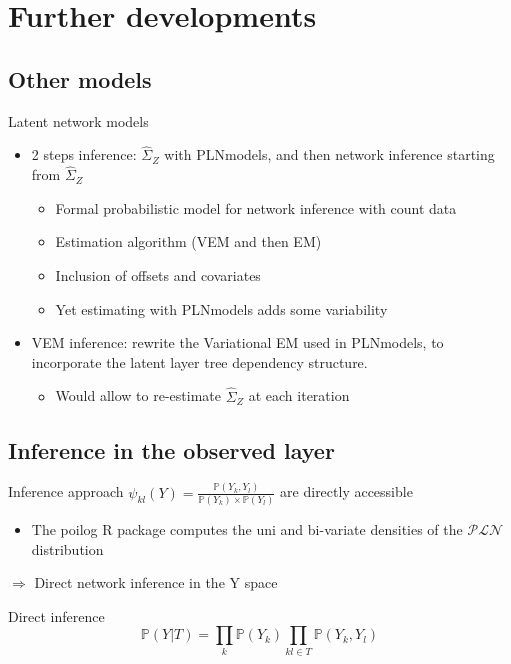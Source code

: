 \documentclass[9pt]{beamer}
\newcommand{\emphase}[1]{\textcolor{Complement}{#1}}
\begin{document}
\section{Further developments}
\subsection{Other models}
\begin{frame}{Latent network models}
\large{
    \begin{itemize}
        \item 2 steps inference: $\hat{\Sigma}_Z$ with {\selectfont
PLNmodels}, and then network inference starting from $\hat{\Sigma}_Z$
\begin{itemize}
	\item Formal probabilistic model for network inference with \emphase{count data}
	\item  Estimation algorithm (VEM and then EM)
	\item Inclusion of \emphase{offsets} and \emphase{covariates}
    \item Yet estimating with
{\selectfont
PLNmodels} adds some variability \bigskip
        \end{itemize}
        \item VEM inference: rewrite the Variational EM used in {\selectfont
PLNmodels}, to incorporate the latent layer tree dependency structure.
         \begin{itemize}
             \item Would allow to re-estimate  $\hat{\Sigma}_Z$ at each iteration
         \end{itemize}
         
    \end{itemize}}
\end{frame}
\subsection{Inference in the observed layer}
\begin{frame}{Inference approach }
  \large{$\psi_{kl}(Y) = \frac{\mathds{P}(Y_k,Y_l)}{\mathds{P}(Y_k)\times \mathds{P}(Y_l)} $} \normalsize are \emphase{directly accessible} \vspace{0.5cm}
    \begin{itemize}
        \item The {\selectfont
poilog} R package computes the uni and bi-variate densities of the $\mathcal{PLN}$ distribution 
    \end{itemize}


\begin{center}
    $\Rightarrow$ Direct network inference in the Y space\\
\end{center}
\begin{block}{Direct inference}
\[\mathds{P}(Y|T) = \prod_k \mathds{P}(Y_k) \prod_{kl \in T} \mathds{P}(Y_k,Y_l)\]

\end{block}

\end{frame}
\end{document}
